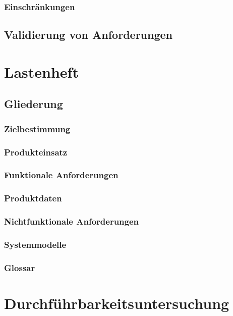 \documentclass[a4paper]{article}
\theoremstyle{break}
\begin{document}
\subsubsection{Einschränkungen}
\subsection{Validierung von Anforderungen}
\newpage
\section{Lastenheft}
\subsection{Gliederung}
\localtableofcontents
\subsubsection{Zielbestimmung}
\subsubsection{Produkteinsatz}
\subsubsection{Funktionale Anforderungen}
\subsubsection{Produktdaten}
\subsubsection{Nichtfunktionale Anforderungen}
\subsubsection{Systemmodelle}
\subsubsection{Glossar}
\newpage
\section{Durchführbarkeitsuntersuchung}
\end{document}
